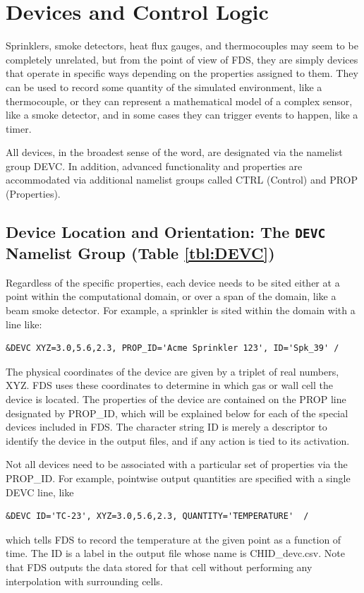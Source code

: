 \documentclass[11pt]{book}
\begin{document}
\chapter{Devices and Control Logic}

Sprinklers, smoke detectors, heat flux gauges, and thermocouples may seem to be completely unrelated, but from the point of view of FDS, they are simply devices that operate in specific ways depending on the properties assigned to them. They can be used to record some quantity of the simulated environment, like a thermocouple, or they can represent a mathematical model of a complex sensor, like a smoke detector, and in some cases they can trigger events to happen, like a timer.

All devices, in the broadest sense of the word, are designated via the namelist group {\ct DEVC}. In addition, advanced functionality and properties are accommodated via additional namelist groups called {\ct CTRL} (Control) and {\ct PROP} (Properties).


\section{Device Location and Orientation: The \texorpdfstring{{\tt DEVC}}{DEVC} Namelist Group (Table \ref{tbl:DEVC})}
\label{info:DEVC}

Regardless of the specific properties, each device needs to be sited either at a point within the computational domain, or
over a span of the domain, like a beam smoke detector. For example, a sprinkler is sited within the domain with a line like:
\begin{lstlisting}
&DEVC XYZ=3.0,5.6,2.3, PROP_ID='Acme Sprinkler 123', ID='Spk_39' /
\end{lstlisting}
The physical coordinates of the device are given by a triplet of real numbers, {\ct XYZ}.  FDS uses these coordinates to determine in which gas or wall cell the device is located. The properties of the device are contained on the {\ct PROP} line designated by {\ct PROP\_ID}, which will be explained below for each of the special devices included in FDS. The character string {\ct ID} is merely a descriptor to identify the device in the output files, and if any action is tied to its activation.

Not all devices need to be associated with a particular set of properties via the {\ct PROP\_ID}. For example, pointwise output quantities are specified with a single {\ct DEVC} line, like
\begin{lstlisting}
&DEVC ID='TC-23', XYZ=3.0,5.6,2.3, QUANTITY='TEMPERATURE'  /
\end{lstlisting}
which tells FDS to record the temperature at the given point as a function of time. The {\ct ID} is a label in the output file whose name is {\ct CHID\_devc.csv}. Note that FDS outputs the data stored for that cell without performing any interpolation with surrounding cells.
\end{document}
